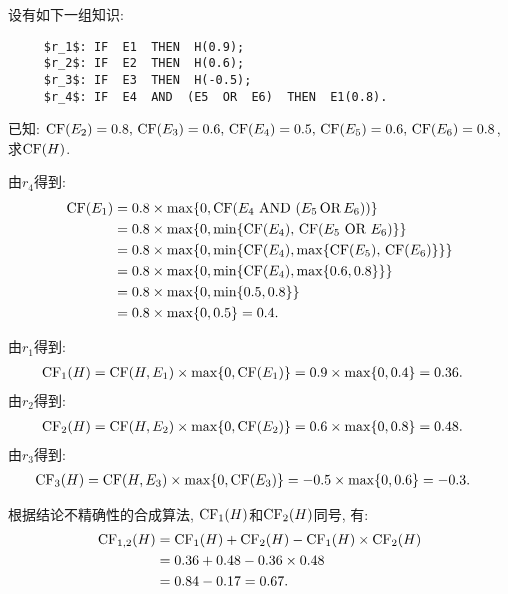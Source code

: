 \begin{example}
设有如下一组知识:
\begin{Verbatim}
     $r_1$: IF  E1  THEN  H(0.9);
     $r_2$: IF  E2  THEN  H(0.6);
     $r_3$: IF  E3  THEN  H(-0.5);
     $r_4$: IF  E4  AND  (E5  OR  E6)  THEN  E1(0.8).
\end{Verbatim}
已知: $\textup{CF}(E_2)=0.8,\, \textup{CF}(E_3)=0.6,\, \textup{CF}(E_4)=0.5,\, \textup{CF}(E_5)=0.6,\, \textup{CF}(E_6)=0.8$, 求$\textup{CF}(H)$.
\end{example}
\begin{result}
由$r_4$得到:
\begin{align*}
    \textup{CF}(E_1)&=0.8\times \max\{ 0, \textup{CF}(E_4\,\, \textup{AND} \,\,  (E_5\,  \textup{OR}\,   E_6)) \}\\
          &=0.8\times \max\{ 0, \min\{\textup{CF}(E_4),\,  \textup{CF}(E_5\,\,   \textup{OR}\,\,    E_6)\} \}\\
          &=0.8\times \max\{ 0, \min\{\textup{CF}(E_4),  \max\{\textup{CF}(E_5),\,  \textup{CF}(E_6)\}\} \}\\
          &=0.8\times \max\{ 0, \min\{\textup{CF}(E_4),  \max\{0.6,  0.8\}\} \}\\
          &=0.8\times \max\{ 0, \min\{0.5,  0.8\} \}\\
          &=0.8\times \max\{ 0,  0.5 \} = 0.4.
\end{align*}
\end{result}
由$r_1$得到:
\begin{align*}
    \textup{CF}_1(H)&=\textup{CF}(H, E_1)\times \max\{0,  \textup{CF}(E_1)\}=0.9\times \max\{0,  0.4\} = 0.36.
\end{align*}
    由$r_2$得到:
\begin{align*}
    \textup{CF}_2(H)&=\textup{CF}(H, E_2)\times \max\{0,  \textup{CF}(E_2)\}=0.6\times \max\{0,  0.8\} = 0.48.
\end{align*}
由$r_3$得到:
\begin{align*}
    \textup{CF}_3(H)&=\textup{CF}(H, E_3)\times \max\{0,  \textup{CF}(E_3)\}=-0.5\times \max\{0,  0.6\} = -0.3.
\end{align*}

根据结论不精确性的合成算法, $\textup{CF}_1(H)$和$\textup{CF}_2(H)$同号, 有:
\begin{align}
  \begin{aligned}
  \textup{CF}_{1,2}(H) &=\textup{CF}_{1}(H)+\textup{CF}_{2}(H)-\textup{CF}_{1}(H) \times \textup{CF}_{2}(H) \\
  &=0.36+0.48-0.36 \times 0.48 \\
  &=0.84-0.17=0.67.
  \end{aligned}
\end{align}

